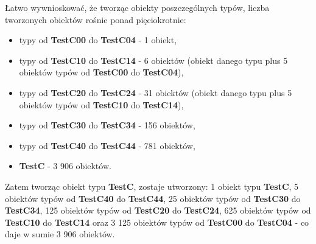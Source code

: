 \documentclass[12pt]{article}
\begin{document}
Łatwo wywnioskować, że tworząc obiekty poszczególnych typów, liczba tworzonych obiektów rośnie ponad pięciokrotnie:
\begin{itemize}
	\item typy od \textbf{TestC00} do \textbf{TestC04} - 1 obiekt,
	\item typy od \textbf{TestC10} do \textbf{TestC14} - 6 obiektów (obiekt danego typu plus 5 obiektów typów od \textbf{TestC00} do \textbf{TestC04}),
	\item typy od \textbf{TestC20} do \textbf{TestC24} - 31 obiektów (obiekt danego typu plus 5 obiektów typów od \textbf{TestC10} do \textbf{TestC14}),
	\item typy od \textbf{TestC30} do \textbf{TestC34} - 156 obiektów,
	\item typy od \textbf{TestC40} do \textbf{TestC44} - 781 obiektów,
	\item \textbf{TestC} - 3 906 obiektów.
\end{itemize}
Zatem tworząc obiekt typu \textbf{TestC}, zostaje utworzony: 1 obiekt typu \textbf{TestC}, 5 obiektów typów od \textbf{TestC40} do \textbf{TestC44}, 25 obiektów typów od \textbf{TestC30} do \textbf{TestC34}, 125 obiektów typów od \textbf{TestC20} do \textbf{TestC24}, 625 obiektów typów od \textbf{TestC10} do \textbf{TestC14} oraz 3 125 obiektów typów od \textbf{TestC00} do \textbf{TestC04} - co daje w sumie 3 906 obiektów.
\end{document}
